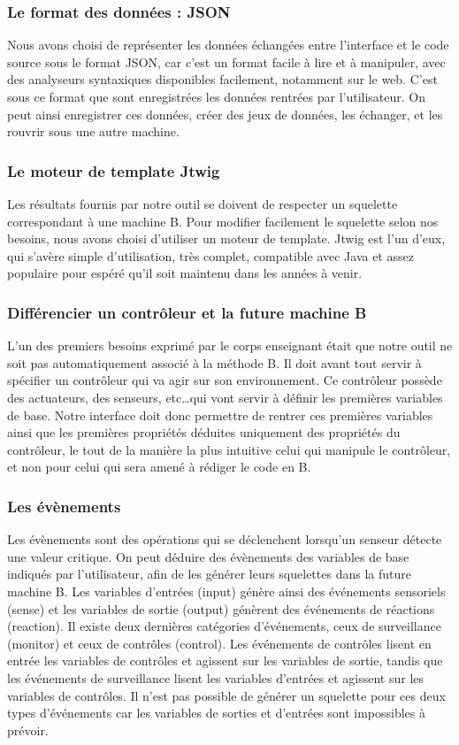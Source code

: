 \documentclass{article}
\begin{document}
\subsubsection{Le format des données : JSON}
    Nous avons choisi de représenter les données échangées entre l'interface et le code source sous le format JSON, car c'est un format facile à lire et à manipuler, avec des analyseurs syntaxiques disponibles facilement, notamment sur le web. C'est sous ce format que sont enregistrées les données rentrées par l'utilisateur. On peut ainsi enregistrer ces données, créer des jeux de données, les échanger, et les rouvrir sous une autre machine. 

\subsubsection{Le moteur de template Jtwig}
    Les résultats fournis par notre outil se doivent de respecter un squelette correspondant à une machine B. Pour modifier facilement le squelette selon nos besoins, nous avons choisi d'utiliser un moteur de template. Jtwig est l'un d'eux, qui s'avère simple d'utilisation, très complet, compatible avec Java et assez populaire pour espéré qu'il soit maintenu dans les années à venir. 
    
    \subsubsection{Différencier un contrôleur et la future machine B}
    L'un des premiers besoins exprimé par le corps enseignant était que notre outil ne soit pas automatiquement associé à la méthode B. Il doit avant tout servir à spécifier un contrôleur qui va agir sur son environnement. Ce contrôleur possède des actuateurs, des senseurs, etc\dots qui vont servir à définir les premières variables de base. Notre interface doit donc permettre de rentrer ces premières variables ainsi que les premières propriétés déduites uniquement des propriétés du contrôleur, le tout de la manière la plus intuitive celui qui manipule le contrôleur, et non pour celui qui sera amené à rédiger le code en B.
    
\subsubsection{Les évènements}
    Les évènements sont des opérations qui se déclenchent lorsqu'un senseur détecte une valeur critique. On peut déduire des évènements des variables de base indiqués par l'utilisateur, afin de les générer leurs squelettes dans la future machine B. Les variables d'entrées (input) génère ainsi des événements sensoriels (sense) et les variables de sortie (output) génèrent des événements de réactions (reaction). Il existe deux dernières catégories d'événements, ceux de surveillance (monitor) et ceux de contrôles (control). Les événements de contrôles lisent en entrée les variables de contrôles et agissent sur les variables de sortie, tandis que les événements de surveillance lisent les variables d'entrées et agissent sur les variables de contrôles. Il n'est pas possible de générer un squelette pour ces deux types d'événements car les variables de sorties et d'entrées sont impossibles à prévoir.
    
\end{document}
